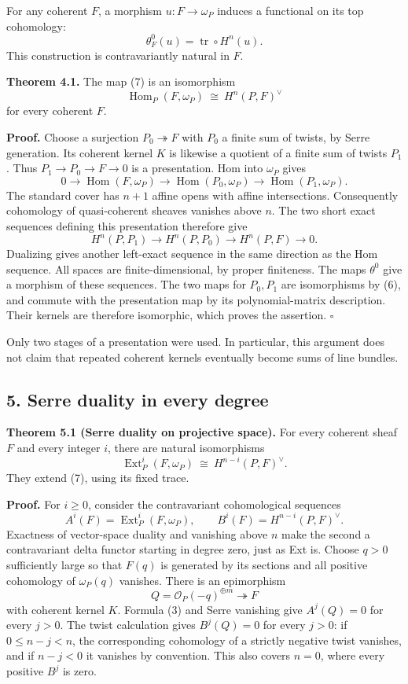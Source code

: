 \documentclass[11pt]{article}
\begin{document}
For any coherent \(F\), a morphism \(u:F\to\omega_P\) induces a
functional on its top cohomology: \[
\theta_F^0(u)=\operatorname{tr}\circ H^n(u).
\tag{7}
\] This construction is contravariantly natural in \(F\).

\textbf{Theorem 4.1.} The map (7) is an isomorphism \[
\operatorname{Hom}_P(F,\omega_P)
 \ \cong\ H^n(P,F)^\vee
\] for every coherent \(F\).

\textbf{Proof.} Choose a surjection \(P_0\twoheadrightarrow F\) with
\(P_0\) a finite sum of twists, by Serre generation. Its coherent kernel
\(K\) is likewise a quotient of a finite sum of twists \(P_1\). Thus
\(P_1\to P_0\to F\to0\) is a presentation. Hom into \(\omega_P\) gives
\[
0\to\operatorname{Hom}(F,\omega_P)
 \to\operatorname{Hom}(P_0,\omega_P)
 \to\operatorname{Hom}(P_1,\omega_P).
\] The standard cover has \(n+1\) affine opens with affine
intersections. Consequently cohomology of quasi-coherent sheaves
vanishes above \(n\). The two short exact sequences defining this
presentation therefore give \[
H^n(P,P_1)\to H^n(P,P_0)\to H^n(P,F)\to0.
\] Dualizing gives another left-exact sequence in the same direction as
the Hom sequence. All spaces are finite-dimensional, by proper
finiteness. The maps \(\theta^0\) give a morphism of these sequences.
The two maps for \(P_0,P_1\) are isomorphisms by (6), and commute with
the presentation map by its polynomial-matrix description. Their kernels
are therefore isomorphic, which proves the assertion. \(\square\)

Only two stages of a presentation were used. In particular, this
argument does not claim that repeated coherent kernels eventually become
sums of line bundles.

\subsection{5. Serre duality in every
degree}\label{serre-duality-in-every-degree}

\textbf{Theorem 5.1 (Serre duality on projective space).} For every
coherent sheaf \(F\) and every integer \(i\), there are natural
isomorphisms \[
\operatorname{Ext}^i_P(F,\omega_P)
 \ \cong\ H^{n-i}(P,F)^\vee.
\tag{8}
\] They extend (7), using its fixed trace.

\textbf{Proof.} For \(i\geq0\), consider the contravariant cohomological
sequences \[
A^i(F)=\operatorname{Ext}^i_P(F,\omega_P),
\qquad B^i(F)=H^{n-i}(P,F)^\vee.
\] Exactness of vector-space duality and vanishing above \(n\) make the
second a contravariant delta functor starting in degree zero, just as
Ext is. Choose \(q>0\) sufficiently large so that \(F(q)\) is generated
by its sections and all positive cohomology of \(\omega_P(q)\) vanishes.
There is an epimorphism \[
Q=\mathcal O_P(-q)^{\oplus m}\twoheadrightarrow F
\] with coherent kernel \(K\). Formula (3) and Serre vanishing give
\(A^j(Q)=0\) for every \(j>0\). The twist calculation gives \(B^j(Q)=0\)
for every \(j>0\): if \(0\leq n-j<n\), the corresponding cohomology of a
strictly negative twist vanishes, and if \(n-j<0\) it vanishes by
convention. This also covers \(n=0\), where every positive \(B^j\) is
zero.
\end{document}
